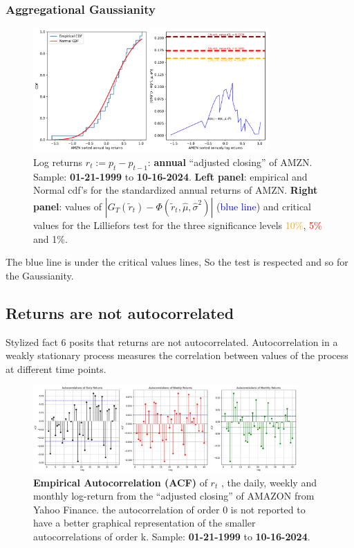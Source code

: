 \documentclass{article}
\begin{document}

\subsubsection{Aggregational Gaussianity}
\begin{figure}[H]
    \centering
    \includegraphics[width=0.8\textwidth]{Img/lillie_test_AMZNannualy.pdf}
    \caption{Log returns $r_t := p_t - p_{t-1}$: \textbf{annual} “adjusted closing” of AMZN. 
    Sample: \textbf{01-21-1999} to \textbf{10-16-2024}. \textbf{Left panel}: empirical and Normal cdf's for the standardized annual returns of AMZN. \textbf{Right panel}: values of $\left| G_T(\tilde{r}_t) - \Phi(\tilde{r}_t, \hat{\mu}, \hat{\sigma}^2) \right|$ (\textcolor{blue}{blue line}) and critical values for the Lilliefors test for the three significance levels \textcolor{orange}{10\%}, \textcolor{red}{5\%} and \textcolor{darkbrown}{1\%}.}
    \label{fig:Lillie_test_weekly}
\end{figure}

\noindent The blue line is under the critical values lines, 
So the test is respected and so for the Gaussianity.
\subsection{Returns are not autocorrelated}

Stylized fact 6 posits that returns are not autocorrelated. Autocorrelation in a weakly stationary process measures the correlation between values of the process at different time points.


\begin{figure}[H]
    \centering
    \includegraphics[width=0.9\textwidth]{Img/Fact6_ACFLogReturns.pdf}
    \caption{\textbf{Empirical Autocorrelation (ACF)} of $r_t$ , the daily, weekly and monthly log-return from the “adjusted closing” of AMAZON from Yahoo Finance.
    the autocorrelation of order 0 is not reported to have a better graphical representation
    of the smaller autocorrelations of order k. Sample: \textbf{01-21-1999} to \textbf{10-16-2024}.
    }
    \label{fig:ACFlogreturn}
\end{figure}
\end{document}
